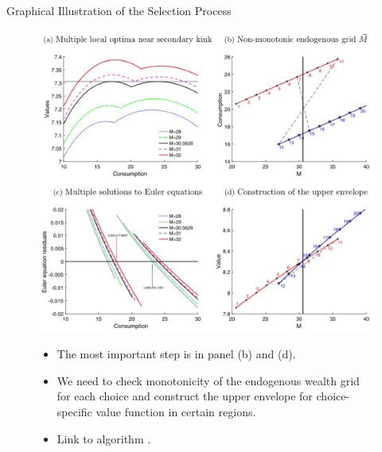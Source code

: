 \documentclass[aspectratio=169]{beamer}
\begin{document}
\begin{frame}{Graphical Illustration of the Selection Process}
	\label{fig:upperenvelope}
	\begin{figure}[htbp!]
		\begin{minipage}{0.55\linewidth}
			\includegraphics[scale=0.5]{fig1.jpg}
		\end{minipage}
		\begin{minipage}{0.4\linewidth}
			\begin{itemize} \small
				\item The most important step is in panel (b) and (d).
				\item We need to check monotonicity of the endogenous wealth grid for each choice and construct the upper envelope for choice-specific value function in certain regions.
				\item Link to algorithm \hyperlink{algo:upperenvelope}{}. 
			\end{itemize}
		\end{minipage}
	\end{figure}
\end{frame}
\end{document}
